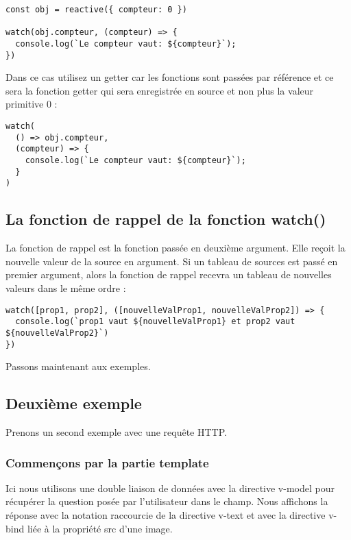 \begin{verbatim}
const obj = reactive({ compteur: 0 })

watch(obj.compteur, (compteur) => {
  console.log(`Le compteur vaut: ${compteur}`);
})
\end{verbatim}
Dans ce cas utilisez un getter car les fonctions sont passées par référence et ce sera la fonction getter qui sera enregistrée en source et non plus la valeur primitive 0 :
\begin{verbatim}
watch(
  () => obj.compteur,
  (compteur) => {
    console.log(`Le compteur vaut: ${compteur}`);
  }
)
\end{verbatim}
\subsection{La fonction de rappel de la fonction {\color{monOrange}watch()}}
La fonction de rappel est la fonction passée en deuxième argument. Elle reçoit la nouvelle valeur de la source en argument. Si un tableau de sources est passé en premier argument, alors la fonction de rappel recevra un tableau de nouvelles valeurs dans le même ordre :
\begin{verbatim}
watch([prop1, prop2], ([nouvelleValProp1, nouvelleValProp2]) => {
  console.log(`prop1 vaut ${nouvelleValProp1} et prop2 vaut ${nouvelleValProp2}`)
})
\end{verbatim}
Passons maintenant aux exemples.



\subsection{Deuxième exemple}
Prenons un second exemple avec une requête HTTP.

\subsubsection{Commençons par la partie {\color{monOrange}template}}
Ici nous utilisons une double liaison de données avec la directive {\color{monOrange}v-model} pour récupérer la question posée par l'utilisateur dans le champ. Nous affichons la réponse avec la notation raccourcie de la directive v-text et avec la directive {\color{monOrange}v-bind} liée à la propriété {\color{monOrange}src} d'une image.

